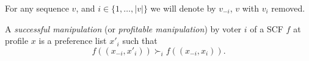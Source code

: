 	\begin{definition}
		For any sequence $v$, and $i \in \{1, \ldots, |v|\}$ we will denote by $v_{-i}$, $v$ with $v_i$ removed.
	\end{definition}

	\begin{definition}
		\label{manipulation-definition}
		A \emph{successful manipulation} (or \emph{profitable manipulation}) by voter $i$ of a SCF $f$ at profile $x$ is a preference list $x'_i$ such that
		\[
			f((x_{-i}, x'_i)) \succ_i f((x_{-i}, x_i)).
		\]
	\end{definition}
